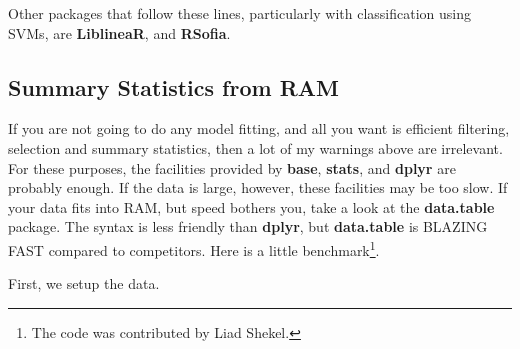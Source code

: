 \documentclass[]{book}
\newenvironment{Shaded}{\begin{snugshade}}{\end{snugshade}}
\newcommand{\CommentTok}[1]{\textcolor[rgb]{0.56,0.35,0.01}{\textit{#1}}}
\newcommand{\ControlFlowTok}[1]{\textcolor[rgb]{0.13,0.29,0.53}{\textbf{#1}}}
\newcommand{\DataTypeTok}[1]{\textcolor[rgb]{0.13,0.29,0.53}{#1}}
\newcommand{\DecValTok}[1]{\textcolor[rgb]{0.00,0.00,0.81}{#1}}
\newcommand{\FloatTok}[1]{\textcolor[rgb]{0.00,0.00,0.81}{#1}}
\newcommand{\KeywordTok}[1]{\textcolor[rgb]{0.13,0.29,0.53}{\textbf{#1}}}
\newcommand{\NormalTok}[1]{#1}
\newcommand{\OperatorTok}[1]{\textcolor[rgb]{0.81,0.36,0.00}{\textbf{#1}}}
\newcommand{\OtherTok}[1]{\textcolor[rgb]{0.56,0.35,0.01}{#1}}
\newcommand{\StringTok}[1]{\textcolor[rgb]{0.31,0.60,0.02}{#1}}
\theoremstyle{definition}
\theoremstyle{definition}
\theoremstyle{definition}
\theoremstyle{remark}
\begin{document}
Other packages that follow these lines, particularly with classification using SVMs, are \textbf{LiblineaR}, and \textbf{RSofia}.

\hypertarget{summary-statistics-from-ram}{%
\subsection{Summary Statistics from RAM}\label{summary-statistics-from-ram}}

If you are not going to do any model fitting, and all you want is efficient filtering, selection and summary statistics, then a lot of my warnings above are irrelevant.
For these purposes, the facilities provided by \textbf{base}, \textbf{stats}, and \textbf{dplyr} are probably enough.
If the data is large, however, these facilities may be too slow.
If your data fits into RAM, but speed bothers you, take a look at the \textbf{data.table} package.
The syntax is less friendly than \textbf{dplyr}, but \textbf{data.table} is BLAZING FAST compared to competitors.
Here is a little benchmark\footnote{The code was contributed by Liad Shekel.}.

First, we setup the data.

\begin{Shaded}
\end{Shaded}
\end{document}
